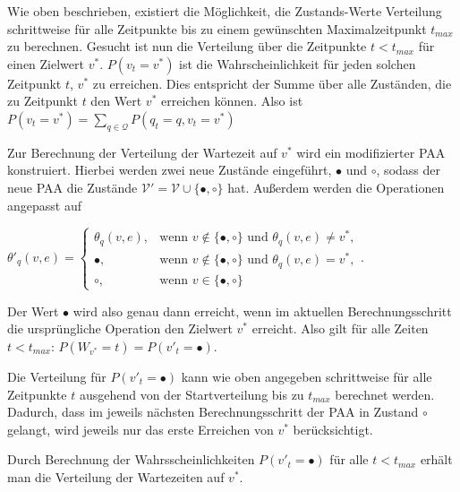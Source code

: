 Wie oben beschrieben, existiert die Möglichkeit, die Zustands-Werte Verteilung schrittweise für alle Zeitpunkte bis zu einem gewünschten Maximalzeitpunkt $t_{max}$ zu berechnen.
Gesucht ist nun die Verteilung über die Zeitpunkte $t < t_{max}$ für einen Zielwert $v^*$. $P(v_{t} = v^*)$ ist die Wahrscheinlichkeit für jeden solchen Zeitpunkt $t$, $v^*$  zu erreichen. Dies entspricht der Summe über alle Zuständen, die zu Zeitpunkt $t$ den Wert $v^*$ erreichen können. Also ist $P(v_t = v^*)  = \sum_{q \in \mathcal{Q}} P(q_{t} = q, v_{t} = v^*)$


Zur Berechnung der Verteilung der Wartezeit auf $v^*$ wird ein modifizierter PAA konstruiert. Hierbei werden zwei neue Zustände eingeführt, $\bullet$ und $\circ$, sodass der neue PAA die Zustände $\mathcal{V}' = \mathcal{V} \cup \{\bullet, \circ\}$ hat. Außerdem werden die Operationen angepasst auf

$ \theta'_q(v,e)=
\begin{cases}
\theta_q(v,e), 	& \text{wenn } v \notin \{\bullet, \circ\} \text{ und } \theta_q(v,e) \neq v^* ,\\
\bullet,	& \text{wenn } v \notin \{\bullet, \circ\} \text{ und } \theta_q(v,e) = v^* ,  \\
\circ, 		& \text{wenn } v \in \{\bullet, \circ\}
\end{cases}$.

Der Wert $\bullet$ wird also genau dann erreicht, wenn im aktuellen Berechnungsschritt die ursprüngliche Operation den Zielwert $v^*$ erreicht. Also gilt für alle Zeiten $t < t_{max}$: $P(W_{v^*} = t) = P(v'_t = \bullet)$.

Die Verteilung für $P(v'_{t} = \bullet)$ kann wie oben angegeben schrittweise für alle Zeitpunkte $t$ ausgehend von der Startverteilung bis zu $t_{max}$ berechnet werden. Dadurch, dass im jeweils nächsten Berechnungsschritt der PAA in Zustand $\circ$ gelangt, wird jeweils nur das erste Erreichen von $v^*$ berücksichtigt.

Durch Berechnung der Wahrsscheinlichkeiten $P(v'_{t} = \bullet)$ für alle $t < t_{max}$ erhält man die Verteilung der Wartezeiten auf $v^*$.

